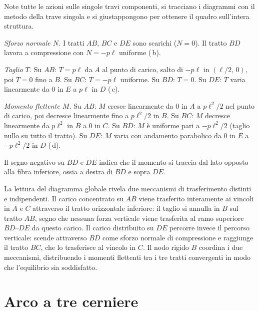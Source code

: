 Note tutte le azioni sulle singole travi
componenti, si tracciano i diagrammi con
il metodo della trave singola e si giustappongono
per ottenere il quadro sull'intera struttura.

\medskip
\noindent\textit{Sforzo normale $N$.}
I tratti $AB$, $BC$ e $DE$ sono scarichi
($N = 0$). Il tratto $BD$ lavora a compressione
con $N = -p\ell$ uniforme (\,b).

\medskip
\noindent\textit{Taglio $T$.}
Su $AB$: $T = p\ell$ da $A$ al punto di carico,
salto di $-p\ell$ in $(\ell/2,\,0)$, poi $T = 0$
fino a $B$.
Su $BC$: $T = -p\ell$ uniforme.
Su $BD$: $T = 0$.
Su $DE$: $T$ varia linearmente da $0$ in $E$
a $p\ell$ in $D$ (\,c).

\medskip
\noindent\textit{Momento flettente $M$.}
Su $AB$: $M$ cresce linearmente da $0$ in $A$
a $p\ell^2/2$ nel punto di carico, poi decresce
linearmente fino a $p\ell^2/2$ in $B$.
Su $BC$: $M$ decresce linearmente da $p\ell^2$
in $B$ a $0$ in $C$.
Su $BD$: $M$ è uniforme pari a $-p\ell^2/2$
(taglio nullo su tutto il tratto).
Su $DE$: $M$ varia con andamento parabolico
da $0$ in $E$ a $-p\ell^2/2$ in $D$ (\,d).

Il segno negativo su $BD$ e $DE$ indica che
il momento si traccia dal lato opposto alla
fibra inferiore, ossia a destra di $BD$ e
sopra $DE$.


\begin{oss}
	La lettura del diagramma globale rivela
	due meccanismi di trasferimento distinti
	e indipendenti. Il carico concentrato su
	$AB$ viene trasferito interamente ai vincoli
	in $A$ e $C$ attraverso il tratto orizzontale
	inferiore: il taglio si annulla in $B$ sul
	tratto $AB$, segno che nessuna forza verticale
	viene trasferita al ramo superiore $BD$--$DE$
	da questo carico. Il carico distribuito su
	$DE$ percorre invece il percorso verticale:
	scende attraverso $BD$ come sforzo normale
	di compressione e raggiunge il tratto $BC$,
	che lo trasferisce al vincolo in $C$. Il
	nodo rigido $B$ coordina i due meccanismi,
	distribuendo i momenti flettenti tra i tre
	tratti convergenti in modo che l'equilibrio
	sia soddisfatto.
\end{oss}


\section{Arco a tre cerniere}
\label{sec:arco_tre_cerniere}

